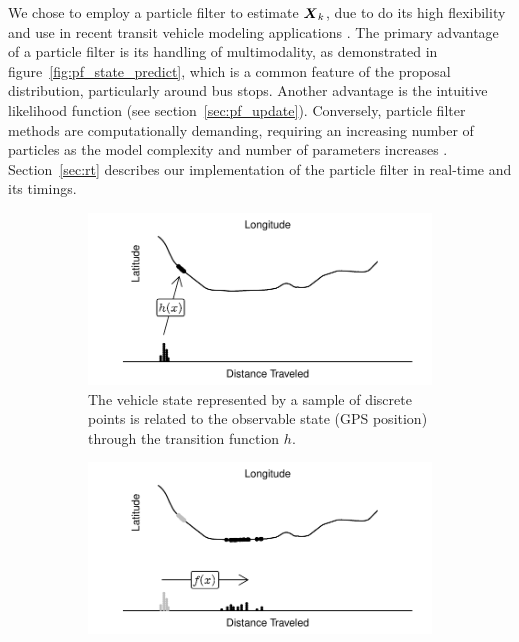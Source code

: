 We chose to employ a particle filter to estimate $\mbox{$\boldsymbol{X}$}_k$,
due to do its high flexibility and use in recent 
transit vehicle modeling applications \citep{Hans_2015}.
The primary advantage of a particle filter is its handling of multimodality,
as demonstrated in figure~\ref{fig:pf_state_predict},
which is a common feature of the proposal distribution, particularly around bus stops.
Another advantage is the intuitive likelihood function (see section~\ref{sec:pf_update}).
Conversely, particle filter methods are computationally demanding,
requiring an increasing number of particles as the model complexity and
number of parameters increases \citep{}.
Section~\ref{sec:rt} describes our implementation of the particle filter in real-time 
and its timings.



\begin{figure}[tb]
    \centering
    \begin{subfigure}[t]{0.48\textwidth}
        \centering
        \includegraphics[width=\textwidth]{figures/03_particle_filter_1.pdf}
        \caption{The vehicle state represented by a sample of discrete points is related to the observable state (GPS position) through the transition function $h$.}
        \label{fig:pf_state_prev}
    \end{subfigure}\;\;
    \begin{subfigure}[t]{0.48\textwidth}
        \centering
        \includegraphics[width=\textwidth]{figures/03_particle_filter_2.pdf}

\end{subfigure}
\end{figure}
